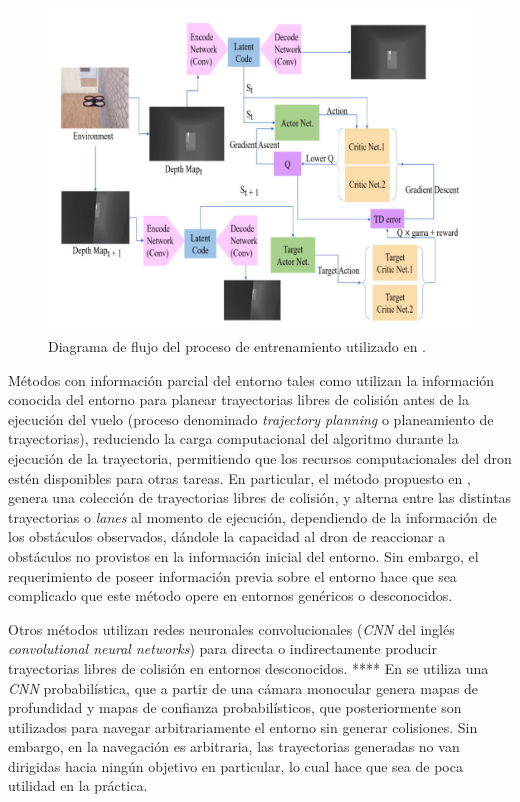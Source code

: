     \begin{figure}[H]
        \centering
        \includegraphics[scale=0.4]{partes/img/RL-training-process.png}
        \caption[Diagrama de flujo del proceso de entrenamiento utilizado en \textit{Vision Based Drone Obstacle Avoidance by Deep Reinforcement Learning}]{Diagrama de flujo del proceso de entrenamiento utilizado en \cite{Xue2021}.}
        \label{fig:rl-training-process}
    \end{figure}

    \par Métodos con información parcial del entorno tales como \cite{Zhang2019} utilizan la información conocida del entorno para planear trayectorias libres de colisión antes de la ejecución del vuelo (proceso denominado \textit{trajectory planning} o planeamiento de trayectorias), reduciendo la carga computacional del algoritmo durante la ejecución de la trayectoria, permitiendo que los recursos computacionales del dron estén disponibles para otras tareas. En particular, el método propuesto en \cite{Zhang2019}, genera una colección de trayectorias libres de colisión, y alterna entre las distintas trayectorias o \textit{lanes} al momento de ejecución, dependiendo de la información de los obstáculos observados, dándole la capacidad al dron de reaccionar a obstáculos no provistos en la información inicial del entorno. Sin embargo, el requerimiento de poseer información previa sobre el entorno hace que sea complicado que este método opere en entornos genéricos o desconocidos.

    \par Otros métodos utilizan redes neuronales convolucionales (\textit{CNN} del inglés \textit{convolutional neural networks}) para directa o indirectamente producir trayectorias libres de colisión en entornos desconocidos. **** En \cite{Yang2021} se utiliza una \textit{CNN} probabilística, que a partir de una cámara monocular genera mapas de profundidad y mapas de confianza probabilísticos, que posteriormente son utilizados para navegar arbitrariamente el entorno sin generar colisiones. Sin embargo, en \cite{Yang2021} la navegación es arbitraria, las trayectorias generadas no van dirigidas hacia ningún objetivo en particular, lo cual hace que sea de poca utilidad en la práctica.

